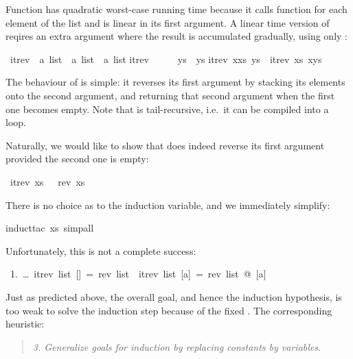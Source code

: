 \begin{isabelle}%
%
\begin{isamarkuptext}%
Function  has quadratic worst-case running time
because it calls function \isa{\at} for each element of the list and
\isa{\at} is linear in its first argument.  A linear time version of
 reqires an extra argument where the result is accumulated
gradually, using only \isa{\#}:%
\end{isamarkuptext}%
\ itrev\ {\isacharcolon}{\isacharcolon}\ {\isachardoublequote}{\isacharprime}a\ list\ {\isasymRightarrow}\ {\isacharprime}a\ list\ {\isasymRightarrow}\ {\isacharprime}a\ list{\isachardoublequote}\isanewline
{}\isanewline
{\isachardoublequote}itrev\ {\isacharbrackleft}{\isacharbrackright}\ \ \ \ \ ys\ {\isacharequal}\ ys{\isachardoublequote}\isanewline
{\isachardoublequote}itrev\ {\isacharparenleft}x{\isacharhash}xs{\isacharparenright}\ ys\ {\isacharequal}\ itrev\ xs\ {\isacharparenleft}x{\isacharhash}ys{\isacharparenright}{\isachardoublequote}%
\begin{isamarkuptext}%
\noindent The behaviour of  is simple: it reverses
its first argument by stacking its elements onto the second argument,
and returning that second argument when the first one becomes
empty. Note that  is tail-recursive, i.e.\ it can be
compiled into a loop.

Naturally, we would like to show that  does indeed reverse
its first argument provided the second one is empty:%
\end{isamarkuptext}%
\ {\isachardoublequote}itrev\ xs\ {\isacharbrackleft}{\isacharbrackright}\ {\isacharequal}\ rev\ xs{\isachardoublequote}%
\begin{isamarkuptxt}%
\noindent
There is no choice as to the induction variable, and we immediately simplify:%
\end{isamarkuptxt}%
induct{\isacharunderscore}tac\ xs{\isacharcomma}\ simp{\isacharunderscore}all{\isacharparenright}%
\begin{isamarkuptxt}%
\noindent
Unfortunately, this is not a complete success:
\begin{isabellepar}%
~1.~\dots~itrev~list~[]~=~rev~list~{\isasymLongrightarrow}~itrev~list~[a]~=~rev~list~@~[a]%
\end{isabellepar}%
Just as predicted above, the overall goal, and hence the induction
hypothesis, is too weak to solve the induction step because of the fixed
\isa{[]}. The corresponding heuristic:
\begin{quote}
{\em 3. Generalize goals for induction by replacing constants by variables.}
\end{quote}


\end{isamarkuptxt}
\end{isabelle}
